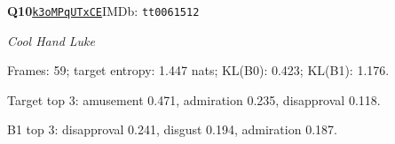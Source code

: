 \par\noindent\begin{minipage}{\textwidth}\small
\textbf{Q10}\quad\href{https://www.youtube.com/watch?v=k3oMPqUTxCE}{\texttt{k3oMPqUTxCE}}\quad IMDb: \texttt{tt0061512}\par
\textit{Cool Hand Luke}\par
Frames: 59; target entropy: 1.447 nats; KL(B0): 0.423; KL(B1): 1.176.\par
Target top 3: amusement 0.471, admiration 0.235, disapproval 0.118.\par
B1 top 3: disapproval 0.241, disgust 0.194, admiration 0.187.\par
\end{minipage}\par\medskip
